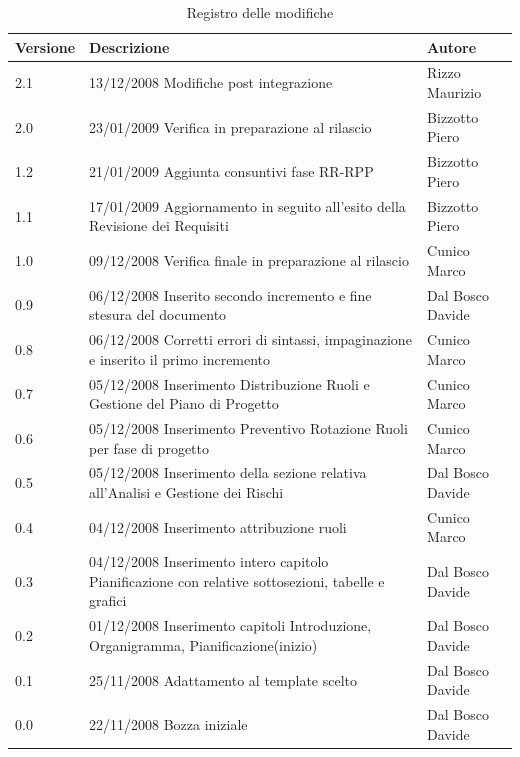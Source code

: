 \begin{center}
	\begin{table}[h]
		  \begin{tabular*}
			{1\textwidth}%
				{@{\extracolsep{\fill}}|p{}|p{}|p{}|}
			 \hline
			\textbf{Versione}  & \textbf{Descrizione} & \textbf{Autore} \\
		 \hline
            \hline
            2.1 & 13$\slash$12$\slash$2008    Modifiche post integrazione  & Rizzo Maurizio \\
            \hline
			2.0 & 23/01/2009	Verifica in preparazione al rilascio & Bizzotto Piero \\
			\hline
			1.2 & 21/01/2009	Aggiunta consuntivi fase RR-RPP & Bizzotto Piero \\
			\hline
			1.1 & 17/01/2009	Aggiornamento in seguito all'esito della Revisione dei Requisiti & Bizzotto Piero \\
			\hline
			1.0 & 	 09$\slash$12$\slash$2008 Verifica finale in preparazione al rilascio & Cunico Marco \\
			\hline
          0.9 & 06/12/2008 Inserito secondo incremento e fine stesura del documento & Dal Bosco Davide\\
          \hline
          0.8 & 06/12/2008 Corretti errori di sintassi, impaginazione e inserito il primo incremento & Cunico Marco \\
		 \hline
          0.7 & 05/12/2008 Inserimento Distribuzione Ruoli e Gestione del Piano di Progetto & Cunico Marco \\
          \hline
          0.6 & 05/12/2008 Inserimento Preventivo Rotazione Ruoli per fase di progetto & Cunico Marco \\
          \hline
          0.5 & 05/12/2008 Inserimento della sezione relativa all'Analisi e Gestione dei Rischi & Dal Bosco Davide \\
          \hline         
          0.4 & 04/12/2008 Inserimento attribuzione ruoli & Cunico Marco \\
          \hline	          
          0.3 & 04/12/2008 Inserimento intero capitolo Pianificazione con relative sottosezioni, tabelle e grafici & Dal Bosco Davide \\
          \hline
    	  0.2 & 01/12/2008 Inserimento capitoli Introduzione, Organigramma, Pianificazione(inizio) & Dal Bosco Davide \\
    	  \hline
    	  0.1 & 25/11/2008 Adattamento al template scelto & Dal Bosco Davide \\
    	  \hline
    	  0.0 & 22/11/2008 Bozza iniziale & Dal Bosco Davide \\

		\hline %
		\end{tabular*}
	\caption{Registro delle modifiche} %
	\label{tab:modifiche}
	\end{table}
\end{center}


